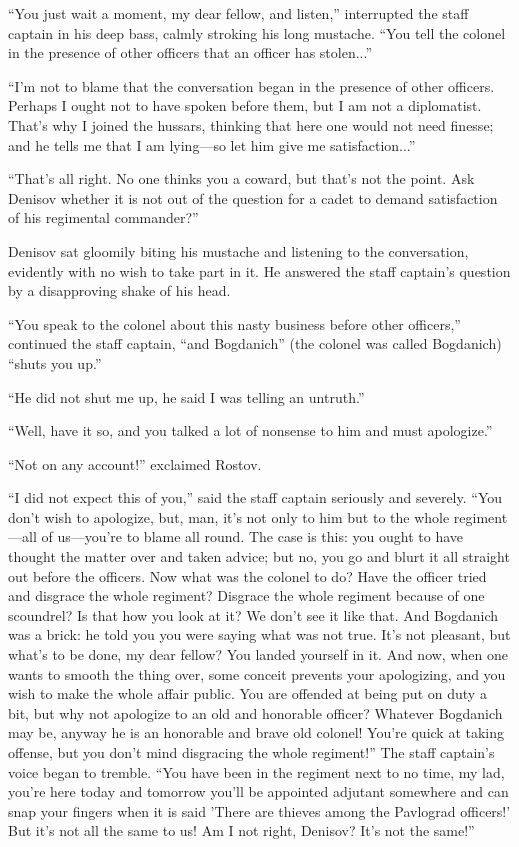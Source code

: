 ``You just wait a moment, my dear fellow, and listen,''
interrupted the staff captain in his deep bass, calmly stroking
his long mustache. ``You tell the colonel in the presence of
other officers that an officer has stolen...''

``I'm not to blame that the conversation began in the presence of
other officers. Perhaps I ought not to have spoken before them,
but I am not a diplomatist. That's why I joined the hussars,
thinking that here one would not need finesse; and he tells me
that I am lying---so let him give me satisfaction...''

``That's all right. No one thinks you a coward, but that's not
the point.  Ask Denisov whether it is not out of the question for
a cadet to demand satisfaction of his regimental commander?''

Denisov sat gloomily biting his mustache and listening to the
conversation, evidently with no wish to take part in it. He
answered the staff captain's question by a disapproving shake of
his head.

``You speak to the colonel about this nasty business before other
officers,'' continued the staff captain, ``and Bogdanich'' (the
colonel was called Bogdanich) ``shuts you up.''

``He did not shut me up, he said I was telling an untruth.''

``Well, have it so, and you talked a lot of nonsense to him and
must apologize.''

``Not on any account!'' exclaimed Rostov.

``I did not expect this of you,'' said the staff captain
seriously and severely. ``You don't wish to apologize, but, man,
it's not only to him but to the whole regiment---all of
us---you're to blame all round. The case is this: you ought to
have thought the matter over and taken advice; but no, you go and
blurt it all straight out before the officers. Now what was the
colonel to do? Have the officer tried and disgrace the whole
regiment? Disgrace the whole regiment because of one scoundrel?
Is that how you look at it? We don't see it like that. And
Bogdanich was a brick: he told you you were saying what was not
true.  It's not pleasant, but what's to be done, my dear fellow?
You landed yourself in it. And now, when one wants to smooth the
thing over, some conceit prevents your apologizing, and you wish
to make the whole affair public. You are offended at being put on
duty a bit, but why not apologize to an old and honorable
officer? Whatever Bogdanich may be, anyway he is an honorable and
brave old colonel! You're quick at taking offense, but you don't
mind disgracing the whole regiment!'' The staff captain's voice
began to tremble. ``You have been in the regiment next to no
time, my lad, you're here today and tomorrow you'll be appointed
adjutant somewhere and can snap your fingers when it is said
'There are thieves among the Pavlograd officers!' But it's not
all the same to us!  Am I not right, Denisov? It's not the
same!''

